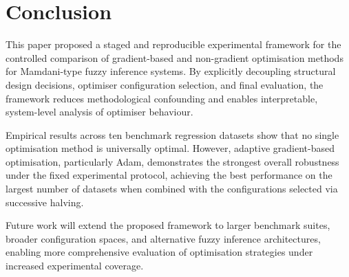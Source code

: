 \documentclass[conference]{IEEEtran}
\begin{document}
\section{Conclusion}

This paper proposed a staged and reproducible experimental framework for the
controlled comparison of gradient-based and non-gradient optimisation methods
for Mamdani-type fuzzy inference systems.
By explicitly decoupling structural design decisions, optimiser configuration
selection, and final evaluation, the framework reduces methodological
confounding and enables interpretable, system-level analysis of optimiser
behaviour.

Empirical results across ten benchmark regression datasets show that no single
optimisation method is universally optimal.
However, adaptive gradient-based optimisation, particularly Adam, demonstrates
the strongest overall robustness under the fixed experimental protocol,
achieving the best performance on the largest number of datasets when combined
with the configurations selected via successive halving.

Future work will extend the proposed framework to larger benchmark suites,
broader configuration spaces, and alternative fuzzy inference architectures,
enabling more comprehensive evaluation of optimisation strategies under
increased experimental coverage.
\end{document}
